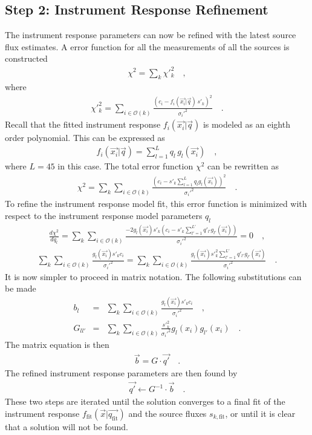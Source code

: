 \documentclass[preprint,pdftex]{aastex}
\newcommand{\fit}{\text{fit}}
\begin{document}
\subsection{Step 2: Instrument Response Refinement}
The instrument response parameters can now be refined with the latest source flux estimates. A error function for all the measurements of all the sources is constructed
\begin{eqnarray*}
\chi^2 = \sum_{k} \chi'^2_k \quad ,
\end{eqnarray*}
where
\begin{eqnarray*}
\chi'^2_k = \sum_{i \in \mathcal{O}(k)} \frac{(c_i-f_{i}(\vec{x_i} | \vec{q}) \, s'_{k})^2}{{\sigma_i'}^2}  \quad .
\end{eqnarray*}
Recall that the fitted instrument response $f_{i}(\vec{x_i} | \vec{q})$ is modeled as an eighth order polynomial. This can be expressed as
\begin{eqnarray*}
f_{i}(\vec{x_i} | \vec{q}) = \sum_{l = 1}^L q_{l} \, g_l(\vec{x_i})  \quad ,
\end{eqnarray*}
where $L = 45$ in this case. The total error function $\chi^2$ can be rewritten as
\begin{eqnarray*}
\chi^2 =\sum_{k} \sum_{i \in \mathcal{O}(k)} \frac{(c_i- s'_{k} \sum_{l = 1}^L q_{l} g_l(\vec{x_i}))^2}{{\sigma_i'}^2}   \quad .
\end{eqnarray*}
To refine the instrument response model fit, this error function is minimized with respect to the instrument response model parameters $q_{l}$
\begin{eqnarray*}
\frac{d\chi^2}{dq_{l}} = \sum_{k} \sum_{i \in \mathcal{O}(k)} \frac{-2 g_l(\vec{x_i}) s'_{k} (c_i- s'_{k} \sum_{l' = 1}^{L'} q'_{l'} g_{l'}(\vec{x_i}))}{{\sigma_i'}^2} = 0  \quad ,
\end{eqnarray*}
\begin{eqnarray*}
\sum_{k} \sum_{i \in \mathcal{O}(k)} \frac{g_l(\vec{x_i}) s'_{k} c_i}{{\sigma_i'}^2} = \sum_{k} \sum_{i \in \mathcal{O}(k)} \frac{g_l (\vec{x_i}) s'^2_{k} \sum_{l' = 1}^{L'} q'_{l'} g_{l'} (\vec{x_i})} {{\sigma_i'}^2}   \quad .
\end{eqnarray*}
It is now simpler to proceed in matrix notation. The following substitutions can be made
\begin{eqnarray}
b_l & = & \sum_{k} \sum_{i \in \mathcal{O}(k)} \frac{g_l(\vec{x_i}) s'_{k} c_i}{\sigma_i'^2}    \quad ,\\
G_{ll'} & = & \sum_{k} \sum_{i \in \mathcal{O}(k)} \frac{{s'}_{k}^2}{\sigma_i'^2} g_l(x_i) g_{l'}(x_i)   \quad .
\end{eqnarray}
The matrix equation is then
\begin{eqnarray*}
\vec{b} = G \cdot \vec{q'}    \quad .
\end{eqnarray*}
The refined instrument response parameters are then found by
\begin{eqnarray*}
\vec{q'} \leftarrow G^{-1}  \cdot \vec{b}   \quad .
\end{eqnarray*}
These two steps are iterated until the solution converges to a final fit of the instrument response $f_\fit(\vec{x} | \vec{q_\fit})$ and the source fluxes $s_{k,\fit}$, or until it is clear that a solution will not be found. 
\end{document}
